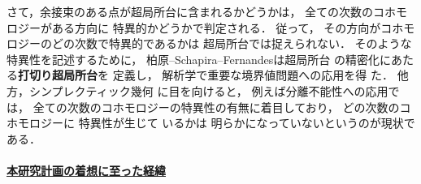 \documentclass[11pt,a4paper,uplatex,dvipdfmx]{ujarticle} 		%
\newcommand{\研究課題名}{打切り超局所台を用いた層のフーリエ変換の研究とシンプレクティック幾何への応用}
\newcommand{\研究機関名}{北海道大学}
\newcommand{\研究代表者氏名}{大柴寿浩}
\begin{document}
さて，余接束のある点が超局所台に含まれるかどうかは，
全ての次数のコホモロジーがある方向に
特異的かどうかで判定される．
従って，
その方向がコホモロジーのどの次数で特異的であるかは
超局所台では捉えられない．
そのような特異性を記述するために，
柏原--Schapira--Fernandesは超局所台
の精密化にあたる\textbf{打切り超局所台}を
定義し，
解析学で重要な境界値問題への応用を得
た\cite{KMS03}．
他方，シンプレクティック幾何
に目を向けると，
例えば分離不能性への応用では，
全ての次数のコホモロジーの特異性の有無に着目しており，
どの次数のコホモロジーに
特異性が生じて
いるかは
明らかになっていないというのが現状である．


\vspace{-16pt}
\paragraph{\underline{本研究計画の着想に至った経緯}}

\end{document}
